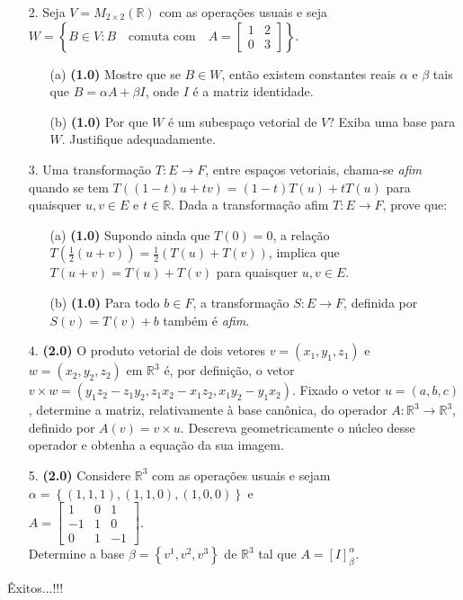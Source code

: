 \documentclass[oneside,a4paper,11pt]{article}
\begin{document}
\begin{itemize}
	\item[2.] Seja $V=M_{2\times2}(\mathbb{R})$ com as operações usuais e seja
	$W=\left\lbrace B\in V: B \quad \text{comuta com}\quad A=\left[\begin{array}{rr}
	1&2\\
	0&3
	\end{array}\right] \right\rbrace $.
	\begin{itemize} 
	\item[(a)]\textbf{(1.0)} Mostre que se $B\in W$, então existem constantes reais $\alpha$ e $\beta$ tais que $B=\alpha A+\beta I$, onde $I$ é a matriz identidade.
	\item[(b)]\textbf{(1.0)} Por que $W$ é um subespaço vetorial de $V$? Exiba uma base para $W$. Justifique adequadamente.
    \end{itemize}
\end{itemize}	
\begin{itemize}	
	\item[3.] Uma transformação $T:E\longrightarrow F$, entre espaços vetoriais, chama-se \textit{afim} quando se tem $T((1-t)u+tv)=(1-t)T(u)+tT(u)$ para quaisquer $u,v \in E$ e $t\in \mathbb{R}$. Dada a transformação afim $T:E\longrightarrow F$, prove que:\\
	\begin{itemize}
	\item[(a)]\textbf{(1.0)} Supondo ainda que $T(0)=0$, a relação $T(\frac{1}{2}(u+v))=\frac{1}{2}(T(u)+T(v))$, implica que $T(u+v)=T(u)+T(v)$ para quaisquer $u,v\in E$. 
	\item[(b)]\textbf{(1.0)} Para todo $b\in F$, a transformação $S:E\longrightarrow F$, definida por $S(v)=T(v)+b$ também é \textit{afim}.
    \end{itemize}
\end{itemize}
\begin{itemize} 
	\item[4.]\textbf{(2.0)} O produto vetorial de dois vetores $v=(x_{1},y_{1},z_{1})$ e $ w=(x_{2}, y_{2}, z_{2})$ em $\mathbb{R}^{3}$ é, por definição, o vetor $v\times w= (y_{1}z_{2}-z_{1}y_{2}, z_{1}x_{2}-x_{1}z_{2},x_{1}y_{2}-y_{1}x_{2})$. Fixado o vetor $u=(a,b,c)$, determine a matriz, relativamente à base canônica, do operador $A:\mathbb{R}^{3} \longrightarrow \mathbb{R}^{3}$, definido por $A(v)=v\times u$. Descreva geometricamente o núcleo desse operador e obtenha a equação da sua imagem.
\end{itemize}
\begin{itemize}
	\item[5.]\textbf{(2.0)} Considere $\mathbb{R}^{3}$ com as operações usuais e sejam $\alpha=\left\lbrace (1,1,1), (1,1,0),(1,0,0) \right\rbrace$ e \\ $A=\left[\begin{array}{rrr}
	1&0&1\\
	-1&1&0\\
	0&1&-1
	\end{array}\right]$.\\
	Determine a base $\beta=\left\lbrace v^{1}, v^{2}, v^{3}\right\rbrace $ de $\mathbb{R}^{3}$ tal que $A=[I]_{\beta}^{\alpha}$.
\end{itemize}

	\flushbottom
	\flushright
     Êxitos...!!!
\end{document}
